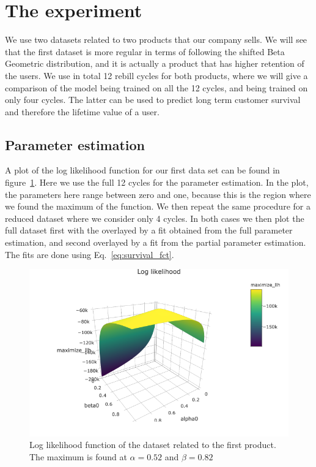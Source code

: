 \documentclass[paper=a4, fontsize=11pt]{scrartcl} %
\numberwithin{equation}{section} %
\numberwithin{figure}{section} %
\numberwithin{table}{section} %
\begin{document}
\section{The experiment}
We use two datasets related to two products that our company sells. We will see that the first dataset is more regular in terms of following the shifted Beta Geometric distribution, and it is actually a product that has higher retention of the users. We use in total 12 rebill cycles for both products, where we will give a comparison of the model being trained on all the 12 cycles, and being trained on only four cycles. The latter can be used to predict long term customer survival and therefore the lifetime value of a user.

\subsection{Parameter estimation}
A plot of the log likelihood function for our first data set can be found in figure~\ref{fig:loglikelihood}. Here we use the full 12 cycles for the parameter estimation. In the plot, the parameters here range between zero and one, because this is the region where we found the maximum of the function. We then repeat the same procedure for a reduced dataset where we consider only 4 cycles. In both cases we then plot the full dataset first with the overlayed by a fit obtained from the full parameter estimation, and second overlayed by a fit from the partial parameter estimation. The fits are done using Eq.~\ref{eq:survival_fct}. 

\begin{figure}[h!]
	\centering
	\includegraphics[width=1\textwidth]{./figures/loglikelihood.png}
	\caption{Log likelihood function of the dataset related to the first product. The maximum is found at $\alpha = 0.52$ and $\beta = 0.82$}
	\label{fig:loglikelihood}
\end{figure}
\end{document}
